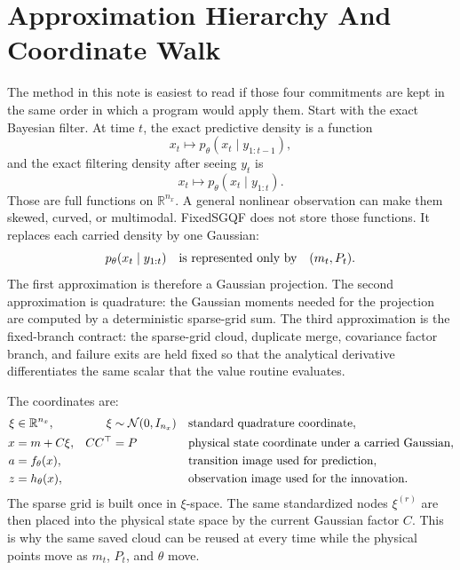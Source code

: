 \documentclass[11pt]{article}
\numberwithin{equation}{section}
\newcommand{\R}{\mathbb R}
\newcommand{\N}{\mathcal N}
\begin{document}
\section{Approximation Hierarchy And Coordinate Walk}
\label{sec:p32-hierarchy}

The method in this note is easiest to read if those four commitments are kept in
the same order in which a program would apply them.  Start with the exact
Bayesian filter.  At time \(t\), the exact predictive density is a function
\[
  x_t\mapsto p_\theta(x_t\mid y_{1:t-1}),
\]
and the exact filtering density after seeing \(y_t\) is
\[
  x_t\mapsto p_\theta(x_t\mid y_{1:t}).
\]
Those are full functions on \(\R^{n_x}\).  A general nonlinear observation can
make them skewed, curved, or multimodal.  FixedSGQF does not store those
functions.  It replaces each carried density by one Gaussian:
\[
  p_\theta(x_t\mid y_{1:t})
  \quad\hbox{is represented only by}\quad
  (m_t,P_t).
\]
The first approximation is therefore a Gaussian projection.  The second
approximation is quadrature: the Gaussian moments needed for the projection are
computed by a deterministic sparse-grid sum.  The third approximation is the
fixed-branch contract: the sparse-grid cloud, duplicate merge, covariance
factor branch, and failure exits are held fixed so that the analytical
derivative differentiates the same scalar that the value routine evaluates.

The coordinates are:
\begin{align}
  \xi &\in \R^{n_x},
  &\xi&\sim\N(0,I_{n_x})
  &&\hbox{standard quadrature coordinate},
  \label{eq:p32-standard-coordinate}\\
  x &= m+C\xi,
  &CC^\top&=P
  &&\hbox{physical state coordinate under a carried Gaussian},
  \label{eq:p32-physical-coordinate}\\
  a &= f_\theta(x),
  &&
  &&\hbox{transition image used for prediction},
  \label{eq:p32-transition-coordinate}\\
  z &= h_\theta(x),
  &&
  &&\hbox{observation image used for the innovation}.
  \label{eq:p32-observation-coordinate}
\end{align}
The sparse grid is built once in \(\xi\)-space.  The same standardized nodes
\(\xi^{(r)}\) are then placed into the physical state space by the current
Gaussian factor \(C\).  This is why the same saved cloud can be reused at every
time while the physical points move as \(m_t\), \(P_t\), and \(\theta\) move.
\end{document}
